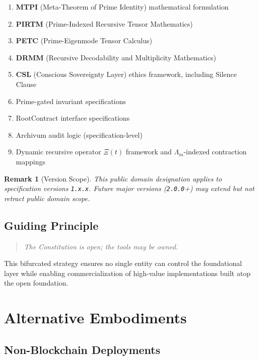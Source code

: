 \documentclass[11pt,a4paper]{article}
\newtheorem{remark}[theorem]{Remark}
\newcommand{\Archivum}{\textsf{Archivum}}
\newcommand{\XiOp}{\Xi(t)}
\begin{document}
\begin{enumerate}[noitemsep]
    \item \textbf{MTPI} (Meta-Theorem of Prime Identity) mathematical formulation
    \item \textbf{PIRTM} (Prime-Indexed Recursive Tensor Mathematics)
    \item \textbf{PETC} (Prime-Eigenmode Tensor Calculus)
    \item \textbf{DRMM} (Recursive Decodability and Multiplicity Mathematics)
    \item \textbf{CSL} (Conscious Sovereignty Layer) ethics framework, including Silence Clause
    \item Prime-gated invariant specifications
    \item RootContract interface specifications
    \item \Archivum{} audit logic (specification-level)
    \item Dynamic recursive operator $\XiOp$ framework and $\Lambda_m$-indexed contraction mappings
\end{enumerate}

\begin{remark}[Version Scope]
This public domain designation applies to specification versions \texttt{1.x.x}. Future major versions (\texttt{2.0.0}+) may extend but not retract public domain scope.
\end{remark}

\subsection{Guiding Principle}

\begin{quote}
\textit{The Constitution is open; the tools may be owned.}
\end{quote}

This bifurcated strategy ensures no single entity can control the foundational layer while enabling commercialization of high-value implementations built atop the open foundation.

\section{Alternative Embodiments}

\subsection{Non-Blockchain Deployments}
\end{document}
